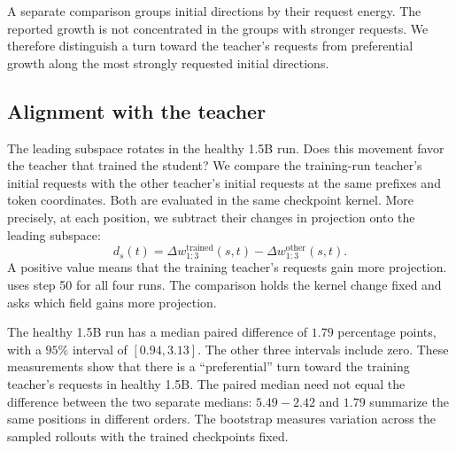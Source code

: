 A separate comparison groups initial directions by their request energy. The reported growth is not concentrated in the groups with stronger requests. We therefore distinguish a turn toward the teacher's requests from preferential growth along the most strongly requested initial directions.


\FloatBarrier
{}
\subsection{Alignment with the teacher}
\label{app:collective-specificity}
The leading subspace rotates in the healthy 1.5B run. Does this movement favor the teacher that trained the student? We compare the training-run teacher's initial requests with the other teacher's initial requests at the same prefixes and token coordinates. Both are evaluated in the same checkpoint kernel. More precisely, at each position, we subtract their changes in projection onto the leading subspace:
\[
 d_s(t)=\Delta w_{1:3}^{\mathrm{trained}}(s,t)
       -\Delta w_{1:3}^{\mathrm{other}}(s,t).
\]
A positive value means that the training teacher's requests gain more projection.  uses step 50 for all four runs. The comparison holds the kernel change fixed and asks which field gains more projection.

\begin{table}[htb]
\centering\small\setlength{\tabcolsep}{3.5pt}

\caption{\textbf{Comparison of the two teachers' requests at step 50.} Values are medians over the same 160 positions. The paired difference is the median of the per-position differences. For each of 3,000 bootstrap samples, we resample the eleven initial rollouts and retain all selected positions in each sampled rollout. The two fields remain paired and the trained checkpoints remain fixed.}
\label{tab:collective-specificity}
\end{table}

The healthy 1.5B run has a median paired difference of $1.79$ percentage points, with a $95\%$ interval of $[0.94,3.13]$. The other three intervals include zero. These measurements show that there is a ``preferential'' turn toward the training teacher's requests in healthy 1.5B. The paired median need not equal the difference between the two separate medians: $5.49-2.42$ and $1.79$ summarize the same positions in different orders. The bootstrap measures variation across the sampled rollouts with the trained checkpoints fixed.

